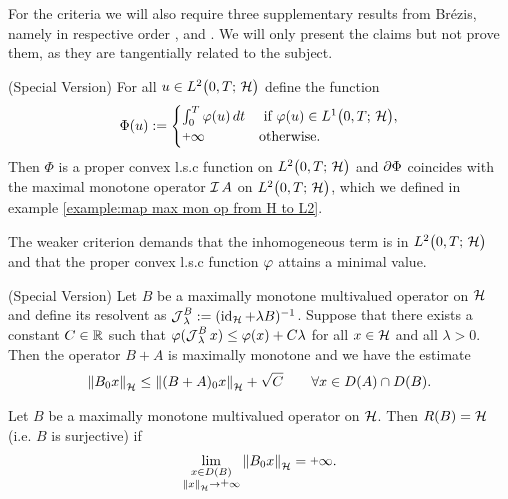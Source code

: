 For the criteria we will also require three supplementary
results from Brézis, namely 
in respective order \cite[Proposition 2.16]{brezis1973ope},
\cite[Proposition 2.17]{brezis1973ope} and
\cite[Corollary 2.3]{brezis1973ope}. 
We will only present the claims but not prove them,
as they are tangentially related to the subject.

\begin{proposition}\label{proposition:b216}
	{\selectfont(Special Version)}
	For all $ u\in L^{2}\big(0,T;\,\mathcal{H}\big) $ define the function
	\begin{align*}
		\Phi(u):=\begin{cases}
			\int_0^T \vp(u)\,dt
			& \text{ if }\vp(u)\in\lone,\\
			\plus\infty
			& \text{otherwise}.
		\end{cases}
	\end{align*}
	Then $ \Phi $ is a proper convex l.s.c
	function on	 $ L^{2}\big(0,T;\,\mathcal{H}\big) $ and $ \partial\Phi $
	coincides with the maximal monotone operator $ \operatorname{\mathcal{I}} A $ on $ L^{2}\big(0,T;\,\mathcal{H}\big) $, 
	which we defined
	in example \ref{example:map max mon op from H to L2}.
\end{proposition}

The weaker criterion demands that the inhomogeneous term
is in $ L^{2}\big(0,T;\,\mathcal{H}\big) $ and that the proper convex l.s.c function
$ \varphi $ attains a minimal value.

\begin{proposition}\label{proposition:b217}
	{\selectfont(Special Version)}
	Let $ B $ be a maximally monotone multivalued operator
	on $ \mathcal{H} $ and define its resolvent as
	$ \operatorname{\mathcal{J}}_\lambda^B:=(\operatorname{\mathrm{id}}_{\mathcal{H}}+\lambda B)^{-1} $.
	Suppose that there exists a constant
	$ C\in\mathbb{R} $ such that $ \varphi(\operatorname{\mathcal{J}}_\lambda^B x)\leq \varphi(x)+C\lambda $
	for all $ x\in \mathcal{H} $ and all $ \lambda>0 $. 
	Then the operator $ B+A $ is maximally monotone
	and we have the estimate
	\begin{align}
		\left\Vert B_0 x\right\Vert_{\mathcal{H}}
		\leq \left\Vert (B+A)_0 x\right\Vert_{\mathcal{H}}+\sqrt{C}
		\qquad\forall x\in D(A)\cap D(B).
	\end{align}
\end{proposition}

\begin{proposition}\label{proposition:b23}
	Let $ B $ be a maximally monotone multivalued
	operator on $ \mathcal{H} $. Then $ R(B)=\mathcal{H} $ (i.e. $ B $
	is surjective) if
	\begin{align*}
		\lim_{\substack{x\in D(B) \\
				\norm{x}\ra\plus\infty}}\norm{B_0 x}=\plus\infty.
	\end{align*}
\end{proposition}

